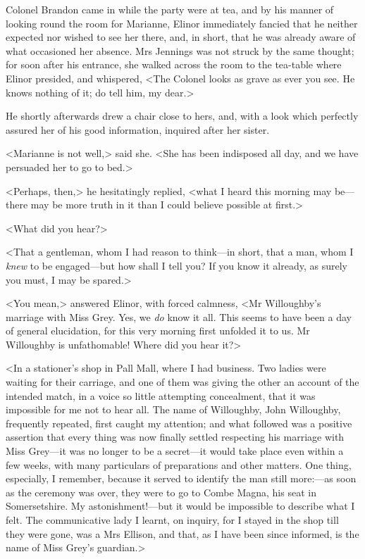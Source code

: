 Colonel Brandon came in while the party were at tea, and by his manner of looking round the room for Marianne, Elinor immediately fancied that he neither expected nor wished to see her there, and, in short, that he was already aware of what occasioned her absence. Mrs Jennings was not struck by the same thought; for soon after his entrance, she walked across the room to the tea-table where Elinor presided, and whispered, <The Colonel looks as grave as ever you see. He knows nothing of it; do tell him, my dear.>

He shortly afterwards drew a chair close to hers, and, with a look which perfectly assured her of his good information, inquired after her sister.

<Marianne is not well,> said she. <She has been indisposed all day, and we have persuaded her to go to bed.>

<Perhaps, then,> he hesitatingly replied, <what I heard this morning may be—there may be more truth in it than I could believe possible at first.>

<What did you hear?>

<That a gentleman, whom I had reason to think—in short, that a man, whom I \textit{knew} to be engaged—but how shall I tell you? If you know it already, as surely you must, I may be spared.>

<You mean,> answered Elinor, with forced calmness, <Mr Willoughby's marriage with Miss Grey. Yes, we \textit{do} know it all. This seems to have been a day of general elucidation, for this very morning first unfolded it to us. Mr Willoughby is unfathomable! Where did you hear it?>

<In a stationer's shop in Pall Mall, where I had business. Two ladies were waiting for their carriage, and one of them was giving the other an account of the intended match, in a voice so little attempting concealment, that it was impossible for me not to hear all. The name of Willoughby, John Willoughby, frequently repeated, first caught my attention; and what followed was a positive assertion that every thing was now finally settled respecting his marriage with Miss Grey—it was no longer to be a secret—it would take place even within a few weeks, with many particulars of preparations and other matters. One thing, especially, I remember, because it served to identify the man still more:—as soon as the ceremony was over, they were to go to Combe Magna, his seat in Somersetshire. My astonishment!—but it would be impossible to describe what I felt. The communicative lady I learnt, on inquiry, for I stayed in the shop till they were gone, was a Mrs Ellison, and that, as I have been since informed, is the name of Miss Grey's guardian.>

